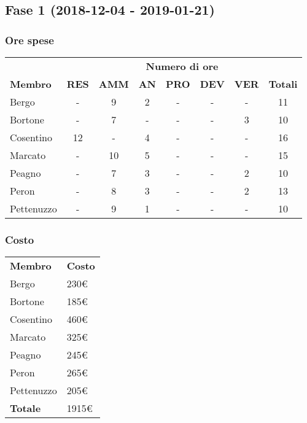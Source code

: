 \subsection{Fase 1 (2018-12-04 - 2019-01-21)}
	\subsubsection{Ore spese}
		\begin{tabular}{| l | c c c c c c | c |}
			\rowcolor{LightBlue}
			& \multicolumn{7}{c}{\textbf{\color{white}Numero di ore}}	\\
	
			\rowcolor{LightBlue}
			\textbf{\color{white}Membro}
			& \textbf{\color{white}RES}
			& \textbf{\color{white}AMM}
			& \textbf{\color{white}AN}
			& \textbf{\color{white}PRO}
			& \textbf{\color{white}DEV}
			& \textbf{\color{white}VER}
			& \textbf{\color{white}Totali}\\
	
			Bergo     & - & 9 & 2 & - & - & - & 11\\
			Bortone   & - & 7 & - & - & - & 3 & 10\\
			Cosentino & 12 & - & 4 & - & - & - & 16\\
			Marcato   & - & 10 & 5 & - & - & - & 15\\
			Peagno    & - & 7 & 3 & - & - & 2 & 10\\
			Peron     & - & 8 & 3 & - & - & 2 & 13\\
			Pettenuzzo & - & 9 & 1 & - & - & - & 10\\ \hline
		\end{tabular}
	\subsubsection{Costo}
		\begin{tabular}{| l | l |}
			\rowcolor{LightBlue}
			\textbf{\color{white}Membro}
			& \textbf{\color{white}Costo}\\
			
			Bergo & 230€\\
			Bortone & 185€\\
			Cosentino & 460€\\
			Marcato & 325€\\
			Peagno & 245€\\
			Peron & 265€\\
			Pettenuzzo & 205€\\ \hline
			\textbf{Totale} & 1915€\\ \hline
		\end{tabular}